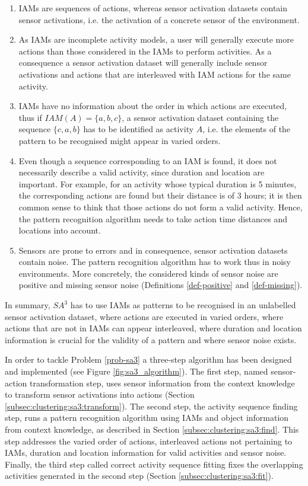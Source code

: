 \begin{enumerate}
 \item IAMs are sequences of actions, whereas sensor activation datasets contain sensor activations, i.e. the activation of a concrete sensor of the environment.
 \item As IAMs are incomplete activity models, a user will generally execute more actions than those considered in the IAMs to perform activities. As a consequence a sensor activation dataset will generally include sensor activations and actions that are interleaved with IAM actions for the same activity.
 \item IAMs have no information about the order in which actions are executed, thus if $IAM(A) = \{a, b, c\}$, a sensor activation dataset containing the sequence $\{c, a, b\}$ has to be identified as activity $A$, i.e. the elements of the pattern to be recognised might appear in varied orders.
 \item Even though a sequence corresponding to an IAM is found, it does not necessarily describe a valid activity, since duration and location are important. For example, for an activity whose typical duration is 5 minutes, the corresponding actions are found but their distance is of 3 hours; it is then common sense to think that those actions do not form a valid activity. Hence, the pattern recognition algorithm needs to take action time distances and locations into account.
 \item Sensors are prone to errors and in consequence, sensor activation datasets contain noise. The pattern recognition algorithm has to work thus in noisy environments. More concretely, the considered kinds of sensor noise are positive and missing sensor noise (Definitions \ref{def-positive} and \ref{def-missing}).
\end{enumerate}

In summary, $SA^3$ has to use IAMs as patterns to be recognised in an unlabelled sensor activation dataset, where actions are executed in varied orders, where actions that are not in IAMs can appear interleaved, where duration and location information is crucial for the validity of a pattern and where sensor noise exists. 

In order to tackle Problem \ref{prob-sa3} a three-step algorithm has been designed and implemented (see Figure \ref{fig:sa3_algorithm}). The first step, named sensor-action transformation step, uses sensor information from the context knowledge to transform sensor activations into actions (Section \ref{subsec:clustering:sa3:transform}). The second step, the activity sequence finding step, runs a pattern recognition algorithm using IAMs and object information from context knowledge, as described in Section \ref{subsec:clustering:sa3:find}. This step addresses the varied order of actions, interleaved actions not pertaining to IAMs, duration and location information for valid activities and sensor noise. Finally, the third step called correct activity sequence fitting fixes the overlapping activities generated in the second step (Section \ref{subsec:clustering:sa3:fit}).

